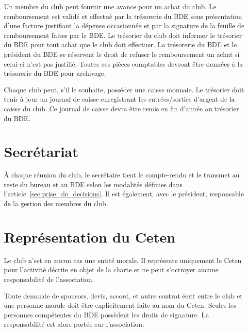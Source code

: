 \documentclass{article}
\begin{document}
\begin{multicols}{2}
{			Un membre du club peut fournir une avance pour un achat du club. Le
			remboursement est validé et effectué par la trésorerie du BDE sous
			présentation d’une facture justifiant la dépense occasionnée et par
			la signature de la feuille de remboursement faites par le BDE\@. Le
			trésorier du club doit informer le trésorier du BDE pour tout achat
			que le club doit effectuer. La trésorerie du BDE et le président du
			BDE se réservent le droit de refuser le remboursement un achat si
			celui-ci n’est pas justifié. Toutes ces pièces comptables devront
			être données à la trésorerie du BDE pour archivage.

			Chaque club peut, s’il le souhaite, posséder une caisse
			monnaie. Le trésorier doit tenir à jour un journal de caisse
			enregistrant les entrées/sorties d’argent de la caisse du
			club. Ce journal de caisse devra être remis en fin d’année au
			trésorier du BDE\@.

		}

		\section{Secrétariat}
\label{sec:secretariat}

		{\small
		
			À chaque réunion du club, le secrétaire tient le compte-rendu et le
			transmet au reste du bureau et au BDE selon les modalités définies
			dans l'article~\ref{sec:prise_de_decisions}. Il est également, avec
			le président, responsable de la gestion des membres du club.
		
		}

		\section{Représentation du Ceten}
\label{sec:representation_du_ceten}

		{\small

			Le club n’est en aucun cas une entité morale. Il représente
			uniquement le Ceten pour l’activité décrite en objet de la charte et
			ne peut s’octroyer aucune responsabilité de l’association.

			Toute demande de sponsors, devis, accord, et autre contrat écrit
			entre le club et une personne morale doit être explicitement faite
			au nom du Ceten. Seules les personnes compétentes du BDE possèdent
			les droits de signature. La responsabilité est alors portée sur
			l’association.

		}


\end{multicols}
\end{document}
